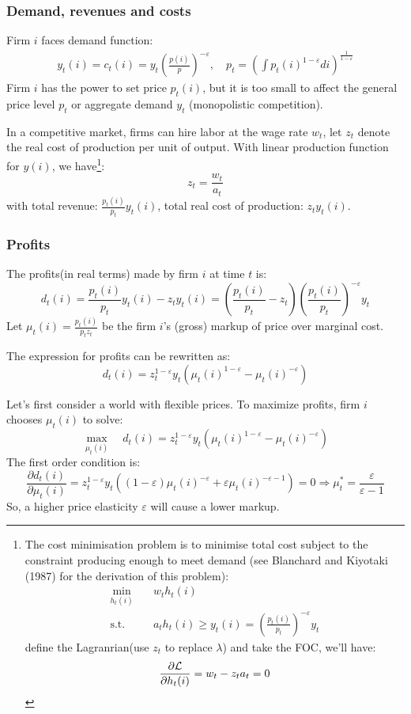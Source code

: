 \subsubsection{Demand, revenues and costs}

Firm $i$ faces demand function:
\begin{align*}
    y_t(i) = c_t(i) = y_t \left( \frac{p(i)}{p} \right)^{-\varepsilon}, \quad p_t = \left( \int p_t(i)^{1-\varepsilon} di \right)^{\frac{1}{1-\varepsilon}}
\end{align*}
Firm $i$ has the power to set price $p_t(i)$, but it is too small to affect
the general price level $p_t$ or aggregate demand $y_t$ (monopolistic
competition).

In a competitive market, firms can hire labor at the wage rate $w_t$, let $z_t$ denote the real cost of production
per unit of output. With linear production function for $y(i)$, we have\footnote{The cost minimisation problem is to minimise
total cost subject to the constraint producing enough to meet demand (see Blanchard and Kiyotaki (1987) for the derivation of this problem):
\begin{align*}
    \min_{h_t(i)} & \quad w_t h_t(i) \\
    \text{s.t.} & \quad  a_t h_t(i) \geq y_t(i) = \left(\frac{p_t(i)}{p_t}\right)^{-\varepsilon}y_t
\end{align*}
define the Lagranrian(use $z_t$ to replace $\lambda$) and take the FOC, we'll have:
\[\frac{\partial \mathcal{L}}{\partial h_t(i)} = w_t - z_t a_t = 0\]}:
\[
z_t = \frac{w_t}{a_t}
\]
with total revenue: $\frac{p_t(i)}{p_t} y_t(i)$, total real cost of production: $z_t y_t(i)$.

\subsubsection{Profits}

The profits(in real terms) made by firm $i$ at time $t$ is:
\[
d_t(i) = \frac{p_t(i)}{p_t} y_t(i) - z_t y_t(i) = \left(\frac{p_t(i)}{p_t}-z_t\right)\left(\frac{p_t(i)}{p_t}\right)^{-\varepsilon}y_t
\]
Let $\mu_t(i) = \frac{p_t(i)}{p_t z_t}$ be the firm $i$'s (gross) markup of price over marginal cost.

The expression for profits can be rewritten as:
\[
d_t(i) = z_t^{1-\varepsilon}y_t (\mu_t(i)^{1-\varepsilon} - \mu_t(i)^{-\varepsilon})
\]

Let's first consider a world with flexible prices. To maximize profits, firm $i$ chooses $\mu_t(i)$ to solve:
\[
\max_{\mu_t(i)} \quad d_t(i) = z_t^{1-\varepsilon}y_t (\mu_t(i)^{1-\varepsilon} - \mu_t(i)^{-\varepsilon})
\]
The first order condition is:
\[
\frac{\partial d_t(i)}{\partial \mu_t(i)} = z_t^{1-\varepsilon}y_t ((1-\varepsilon)\mu_t(i)^{-\varepsilon} + \varepsilon \mu_t(i)^{-\varepsilon-1}) = 0 \Rightarrow \mu_t^* = \frac{\varepsilon}{\varepsilon-1}
\]
So, a higher price elasticity $\varepsilon$ will cause a lower markup.

